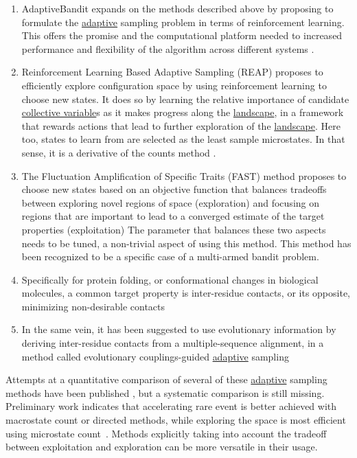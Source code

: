 \documentclass[9pt,review]{livecoms}
\begin{document}
    \begin{enumerate}
    \item AdaptiveBandit expands on the methods described above by proposing to formulate the \hyperlink{ref:Adaptive} {adaptive} sampling problem in terms of reinforcement learning. This offers the promise and the computational platform needed to increased performance and flexibility of the algorithm across different systems \cite{doi:10.1021/acs.jctc.0c00205}.
    \item Reinforcement Learning Based Adaptive Sampling (REAP) proposes to efficiently explore configuration space by using reinforcement learning to choose new states. It does so by learning the relative importance of candidate \hyperlink{ref:CV} {collective variable}s as it makes progress along the \hyperlink{ref:FES} {landscape}, in a framework that rewards actions that lead to further exploration of the \hyperlink{ref:FES} {landscape}. Here too, states to learn from are selected as the least sample microstates. In that sense, it is a derivative of the counts method \cite{doi:10.1021/acs.jpcb.8b06521}.
    \item The Fluctuation Amplification of Specific Traits (FAST) method proposes to choose new states based on an objective function that balances tradeoffs between exploring novel regions of space (exploration) and focusing on regions that are important to lead to a converged estimate of the target properties (exploitation) \cite{doi:10.1021/acs.jctc.5b00737,doi:10.1021/acs.jctc.8b00500} The parameter that balances these two aspects needs to be tuned, a non-trivial aspect of using this method. This method has been recognized to be a specific case of a multi-armed bandit problem.
    \item Specifically for protein folding, or conformational changes in biological molecules, a common target property is inter-residue contacts, or its opposite, minimizing non-desirable contacts \cite{doi:10.1063/1.5053582}
    \item In the same vein, it has been suggested to use evolutionary information by deriving inter-residue contacts from a multiple-sequence alignment, in a method called evolutionary couplings-guided \hyperlink{ref:Adaptive} {adaptive} sampling \cite{shamsi_enhanced_2017}
    \end{enumerate}


Attempts at a quantitative comparison of several of these \hyperlink{ref:Adaptive} {adaptive} sampling methods have been published \cite{doi:10.1063/1.5053582,doi:10.1021/acs.jctc.8b00500}, but a systematic comparison is still missing. Preliminary work indicates that accelerating rare event is better achieved with macrostate count or directed methods, while exploring the space is most efficient using microstate count~\cite{doi:10.1063/1.5053582}. Methods explicitly taking into account the tradeoff between exploitation and exploration can be more versatile in their usage.
\end{document}
